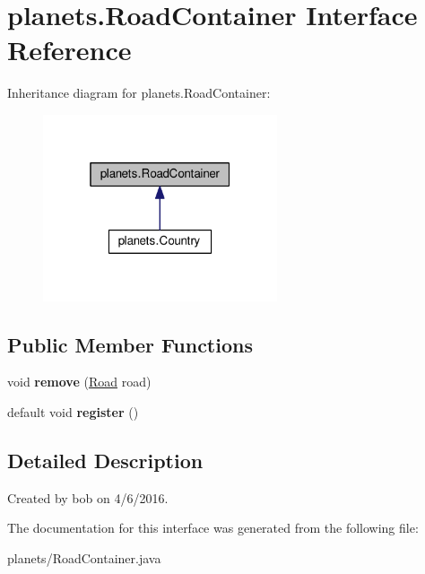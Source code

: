 \hypertarget{interfaceplanets_1_1_road_container}{}\section{planets.\+Road\+Container Interface Reference}
\label{interfaceplanets_1_1_road_container}


Inheritance diagram for planets.\+Road\+Container\+:\nopagebreak
\begin{figure}[H]
\begin{center}
\leavevmode
\includegraphics[width=196pt]{interfaceplanets_1_1_road_container__inherit__graph}
\end{center}
\end{figure}
\subsection*{Public Member Functions}
\begin{DoxyCompactItemize}
\item 
void {\bfseries remove} (\hyperlink{classplanets_1_1_road}{Road} road)\hypertarget{interfaceplanets_1_1_road_container_a1ee9d6e5289a9414b0782655ffc179e6}{}\label{interfaceplanets_1_1_road_container_a1ee9d6e5289a9414b0782655ffc179e6}

\item 
default void {\bfseries register} ()\hypertarget{interfaceplanets_1_1_road_container_a37213389f3e17aff902ce2a4360923d9}{}\label{interfaceplanets_1_1_road_container_a37213389f3e17aff902ce2a4360923d9}

\end{DoxyCompactItemize}


\subsection{Detailed Description}
Created by bob on 4/6/2016. 

The documentation for this interface was generated from the following file\+:\begin{DoxyCompactItemize}
\item 
planets/Road\+Container.\+java\end{DoxyCompactItemize}

